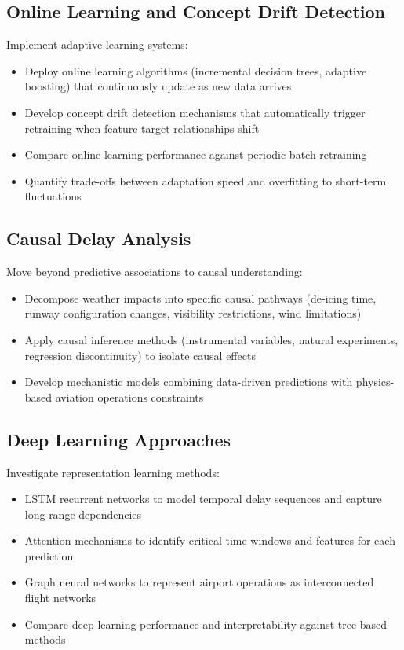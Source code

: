 \documentclass{report}
\begin{document}
\subsection{Online Learning and Concept Drift Detection}

Implement adaptive learning systems:
\begin{itemize}
    \item Deploy online learning algorithms (incremental decision trees, adaptive boosting) that continuously update as new data arrives
    \item Develop concept drift detection mechanisms that automatically trigger retraining when feature-target relationships shift
    \item Compare online learning performance against periodic batch retraining
    \item Quantify trade-offs between adaptation speed and overfitting to short-term fluctuations
\end{itemize}

\subsection{Causal Delay Analysis}

Move beyond predictive associations to causal understanding:
\begin{itemize}
    \item Decompose weather impacts into specific causal pathways (de-icing time, runway configuration changes, visibility restrictions, wind limitations)
    \item Apply causal inference methods (instrumental variables, natural experiments, regression discontinuity) to isolate causal effects
    \item Develop mechanistic models combining data-driven predictions with physics-based aviation operations constraints
\end{itemize}

\subsection{Deep Learning Approaches}

Investigate representation learning methods:
\begin{itemize}
    \item LSTM recurrent networks to model temporal delay sequences and capture long-range dependencies
    \item Attention mechanisms to identify critical time windows and features for each prediction
    \item Graph neural networks to represent airport operations as interconnected flight networks
    \item Compare deep learning performance and interpretability against tree-based methods
\end{itemize}
\end{document}
